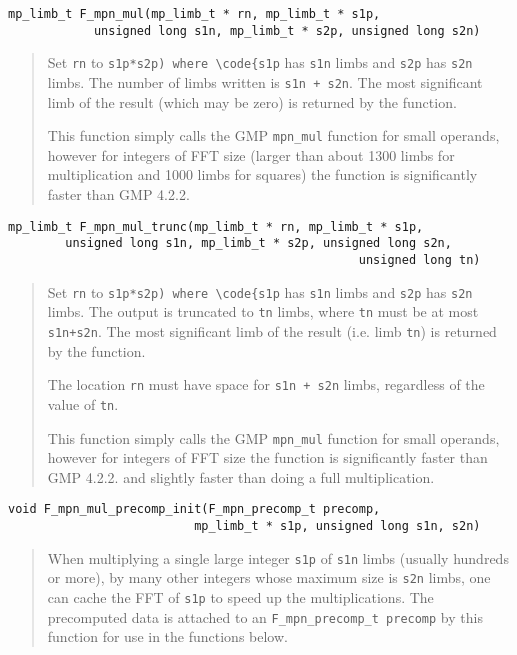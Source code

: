 \documentclass[a4paper,10pt]{article}
\newcommand{\code}{\lstinline}
\begin{document}
\begin{lstlisting}
mp_limb_t F_mpn_mul(mp_limb_t * rn, mp_limb_t * s1p, 
            unsigned long s1n, mp_limb_t * s2p, unsigned long s2n)
\end{lstlisting}
\begin{quote}
Set \code{rn} to \code{s1p*s2p) where \code{s1p} has \code{s1n} limbs and \code{s2p} has \code{s2n} limbs. The number of limbs written is \code{s1n + s2n}. The most significant limb of the result (which may be zero) is returned by the function.

This function simply calls the GMP \code{mpn_mul} function for small operands, however for integers of FFT size (larger than about 1300 limbs for multiplication and 1000 limbs for squares) the function is significantly faster than GMP 4.2.2.
\end{quote}
                                      
\begin{lstlisting}
mp_limb_t F_mpn_mul_trunc(mp_limb_t * rn, mp_limb_t * s1p, 
        unsigned long s1n, mp_limb_t * s2p, unsigned long s2n, 
                                                 unsigned long tn)
\end{lstlisting}
\begin{quote}
Set \code{rn} to \code{s1p*s2p) where \code{s1p} has \code{s1n} limbs and \code{s2p} has \code{s2n} limbs. The output is truncated to \code{tn} limbs, where \code{tn} must be at most \code{s1n+s2n}. The most significant limb of the result (i.e. limb \code{tn}) is returned by the function.

The location \code{rn} must have space for \code{s1n + s2n} limbs, regardless of the value of \code{tn}.

This function simply calls the GMP \code{mpn_mul} function for small operands, however for integers of FFT size the function is significantly faster than GMP 4.2.2. and slightly faster than doing a full multiplication.
\end{quote}

\begin{lstlisting}
void F_mpn_mul_precomp_init(F_mpn_precomp_t precomp, 
                          mp_limb_t * s1p, unsigned long s1n, s2n)
\end{lstlisting}
\begin{quote}
When multiplying a single large integer \code{s1p} of \code{s1n} limbs (usually hundreds or more), by many other integers whose maximum size is \code{s2n} limbs, one can cache the FFT of \code{s1p} to speed up the multiplications. The precomputed data is attached to an \code{F_mpn_precomp_t precomp} by this function for use in the functions below.
\end{quote}
\end{document}
